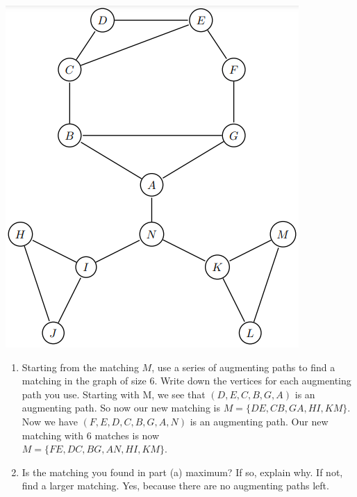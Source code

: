 \documentclass[12pt]{article}
\begin{document}
\begin{enumerate}
\begin{center}
\includegraphics[scale=.5]{Q1.png}
\end{center}

\begin{enumerate}
\item Starting from the matching $M$, use a series of augmenting paths to find a matching in the graph of size 6. Write down the vertices for each augmenting path you use.\m
Starting with M, we see that $(D,E,C,B,G,A)$ is an augmenting path. So now our new matching is $M = \{DE,CB,GA,HI,KM\}$. Now we have $(F,E,D,C,B,G,A,N)$ is an augmenting path. Our new matching with 6 matches is now \\$M = \{FE,DC,BG,AN,HI,KM\}$.

\item Is the matching you found in part (a) maximum? If so, explain why. If not, find a larger matching.\m
Yes, because there are no augmenting paths left.
 
\end{enumerate}



\medskip


\end{enumerate}
\end{document}
